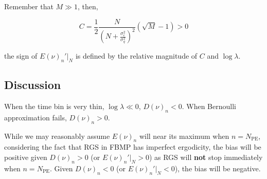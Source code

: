 Remember that $M \gg 1$, then,

\begin{equation}
    C = \frac{1}{2}\frac{N}{(N+\frac{\sigma_\epsilon^2}{\sigma_q^2})^2}(\sqrt{M}-1) > 0
\end{equation}

the sign of $E(\nu)_n'|_N$ is defined by the relative magnitude of $C$ and $\log\lambda$. 

\subsection{Discussion}

When the time bin is very thin, $\log\lambda \ll 0$, $D(\nu)_n < 0$. When Bernoulli approximation fails, $D(\nu)_n > 0$. 

While we may reasonably assume $E(\nu)_n$ will near its maximum when $n=N_\mathrm{PE}$, considering the fact that RGS in FBMP has imperfect ergodicity, the bias will be positive given $D(\nu)_n > 0$ (or $E(\nu)_n'|_N > 0$) as RGS will \textbf{not} stop immediately when $n=N_\mathrm{PE}$. Given $D(\nu)_n < 0$ (or $E(\nu)_n'|_N < 0$), the bias will be negative. 
